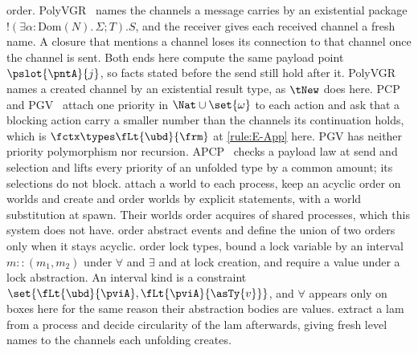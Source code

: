 order.
PolyVGR~\cite{SaffrichT23} names the channels a message carries by an
existential package $!(\exists \alpha{:}\mathrm{Dom}(N).\, \Sigma; T).S$,
and the receiver gives each received channel a fresh name. A closure
that mentions a channel loses its connection to that channel once the
channel is sent. Both ends here compute the same payload point
$\pslot{\pntA}{j}$, so facts stated before the send still hold after it.
PolyVGR names a created channel by an existential result type, as
$\tNew$ does here.
PCP~\cite{DardhaG18} and PGV~\cite{KokkeD23} attach one priority in
$\Nat \cup \set{\omega}$ to each action and ask that a blocking action
carry a smaller number than the channels its continuation holds, which
is $\fctx \types \fLt{\ubd}{\frm}$ at \ref{rule:E-App} here. PGV has
neither priority polymorphism nor recursion.
APCP~\cite{APCP} checks a payload law at send and selection and lifts
every priority of an unfolded type by a common amount; its selections do
not block.
\citet{BalzerTP19} attach a world to each process, keep an acyclic order
on worlds and create and order worlds by explicit statements, with a
world substitution at spawn. Their worlds order acquires of shared
processes, which this system does not have.
\citet{VieiraV13} order abstract events and define the union of two
orders only when it stays acyclic.
\citet{FlanaganA99} order lock types, bound a lock variable by an
interval $m :: (m_1, m_2)$ under $\forall$ and $\exists$ and at
lock creation, and require a value under a lock abstraction. An interval
kind is a constraint $\set{\fLt{\ubd}{\pviA}, \fLt{\pviA}{\asTy{v}}}$,
and $\forall$ appears only on boxes here for the same reason their
abstraction bodies are values.
\citet{KobayashiL17} extract a lam from a process and decide
circularity of the lam afterwards, giving fresh level names to the
channels each unfolding creates.

